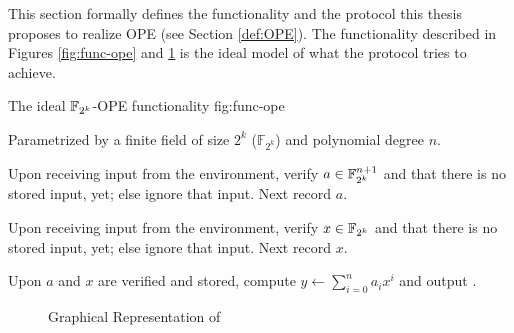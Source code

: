 %
%
\label{sec:protocol}

This section formally defines the functionality \JWfuncSymOPE and the protocol
\JWprotoSymOPE this thesis proposes to realize OPE (see Section \ref{def:OPE}).
The functionality described in Figures \ref{fig:func-ope} and
\ref{fig:graph-ope} is the ideal model of what the protocol tries to achieve.

\begin{JWfunc}%
  {\JWfuncSymOPE}%
  {The ideal $\mathbb{F}_{2^k}{}$-OPE functionality \JWfuncSymOPE{}}%
  {fig:func-ope}

  Parametrized by a finite field of size $2^k$ ($\mathbb{F}_{2^k}$)
  and polynomial degree $n$.

  \begin{JWfuncSteps}

  \item Upon receiving input  from the environment, verify
    $a \in \mathbb{F}_{2^k}^{n+1}$ and that there is no stored input, yet; else
    ignore that input. Next record $a$.

  \item Upon receiving input  from the environment,
    verify $x \in \mathbb{F}_{2^k}{}$ and that there is no stored input, yet;
    else ignore that input. Next record $x$.

  \item Upon $a$ and $x$ are verified and stored, compute $y \leftarrow
    \sum_{i=0}^n a_ix^i$ and output .

  \end{JWfuncSteps}
\end{JWfunc}

\begin{figure}[ht]

  \centering


  \caption{Graphical Representation of \JWfuncSymOPE}
  \label{fig:graph-ope}

\end{figure}

